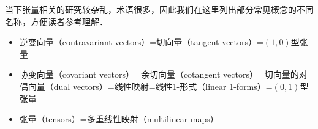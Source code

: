 


当下张量相关的研究较杂乱，术语很多，因此我们在这里列出部分常见概念的不同名称，方便读者参考理解．


\begin{itemize}
\item 逆变向量（contravariant vectors）=切向量（tangent vectors）=$(1, 0)$型张量
\item 协变向量（covariant vectors）=余切向量（cotangent vectors）=切向量的对偶向量（dual vectors）=线性映射=线性1-形式（linear 1-forms）=$(0, 1)$型张量
\item 张量（tensors）=多重线性映射（multilinear maps）
\end{itemize}